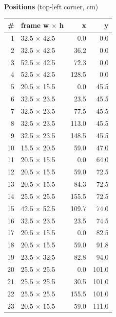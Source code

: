 \documentclass[a4paper,landscape,10pt]{article}
\begin{document}
\begin{minipage}[t]{0.25\textwidth}
\vspace{8pt}
{\bfseries Positions} (top-left corner, cm)\\[2pt]
\tiny
\begin{tabular}{@{}r l r r@{}}
\toprule
\# & frame w $\times$ h & x & y \\
\midrule
1 & 32.5 $\times$ 42.5 & 0.0 & 0.0 \\
2 & 32.5 $\times$ 42.5 & 36.2 & 0.0 \\
3 & 52.5 $\times$ 42.5 & 72.3 & 0.0 \\
4 & 52.5 $\times$ 42.5 & 128.5 & 0.0 \\
5 & 20.5 $\times$ 15.5 & 0.0 & 45.5 \\
6 & 32.5 $\times$ 23.5 & 23.5 & 45.5 \\
7 & 32.5 $\times$ 23.5 & 77.5 & 45.5 \\
8 & 32.5 $\times$ 23.5 & 113.0 & 45.5 \\
9 & 32.5 $\times$ 23.5 & 148.5 & 45.5 \\
10 & 15.5 $\times$ 20.5 & 59.0 & 47.0 \\
11 & 20.5 $\times$ 15.5 & 0.0 & 64.0 \\
12 & 20.5 $\times$ 15.5 & 59.0 & 72.5 \\
13 & 20.5 $\times$ 15.5 & 84.3 & 72.5 \\
14 & 25.5 $\times$ 25.5 & 155.5 & 72.5 \\
15 & 42.5 $\times$ 52.5 & 109.7 & 74.0 \\
16 & 32.5 $\times$ 23.5 & 23.5 & 74.5 \\
17 & 20.5 $\times$ 15.5 & 0.0 & 82.5 \\
18 & 20.5 $\times$ 15.5 & 59.0 & 91.8 \\
19 & 23.5 $\times$ 32.5 & 82.8 & 94.0 \\
20 & 25.5 $\times$ 25.5 & 0.0 & 101.0 \\
21 & 25.5 $\times$ 25.5 & 30.5 & 101.0 \\
22 & 25.5 $\times$ 25.5 & 155.5 & 101.0 \\
23 & 20.5 $\times$ 15.5 & 59.0 & 111.0 \\
\bottomrule
\end{tabular}
\end{minipage}
\clearpage
\end{document}
